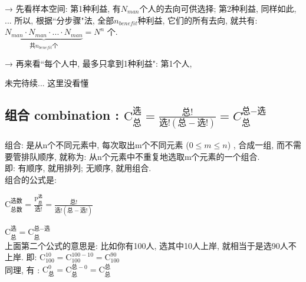 \documentclass[UTF8]{ctexart}
\begin{document}
	→ 先看样本空间: 第1种利益, 有$N_{man}$个人的去向可供选择; 第2种利益, 同样如此, ... 所以, 根据``分步骤"法, 全部$n_{benefit}$种利益, 它们的所有去向, 就共有: $\underset{\text{共}n_{benefit}\text{个}}{\underbrace{N_{man}\cdot N_{man}\cdot ...\cdot N_{man}}}=N^n	$ 个.
	
	→ 再来看``每个人中, 最多只拿到1种利益": 第1个人,
	
	未完待续... 这里没看懂
	
	
	
%		
%		
%		
%		
%		
%		
%
%	
	
	
	
	
	

	\subsection{组合 combination : $
		\text{C}_{\text{总}}^{\text{选}}=\frac{\text{总!}}{\text{选!}\left( \text{总}-\text{选!} \right)}	= C_{\text{总}}^{\text{总}-\text{选}}	$}
	
	组合: 是从n个不同元素中, 每次取出m个不同元素 ($0 \leq m \leq n$) , 合成一组, 而不需要管排队顺序, 就称为: 从n个元素中不重复地选取m个元素的一个组合. \\
	
	即: 有顺序, 就用排列; 无顺序, 就用组合. \\
	
	组合的公式是: 
	
$\boxed{
		\text{C}_{\text{总数}}^{\text{选数}}=\frac{\text{P}_{\text{总}}^{\text{选}}}{\text{选!}}=\frac{\text{总!}}{\text{选!}\left( \text{总}-\text{选!} \right)}	
}$

$\boxed{
		\text{C}_{\text{总}}^{\text{选}}=\text{C}_{\text{总}}^{\text{总}-\text{选}}	
}$ \\

上面第二个公式的意思是: 比如你有100人, 选其中10人上岸, 就相当于是选90人不上岸. 即: $\text{C}_{100}^{10}=\text{C}_{100}^{100-10}=\text{C}_{100}^{90}
$ \\

同理, 有 : $
\boxed{\text{C}_{\text{总}}^{0}=\text{C}_{\text{总}}^{\text{总}-0}=\text{C}_{\text{总}}^{\text{总}}
}$ \\
	
\end{document}
